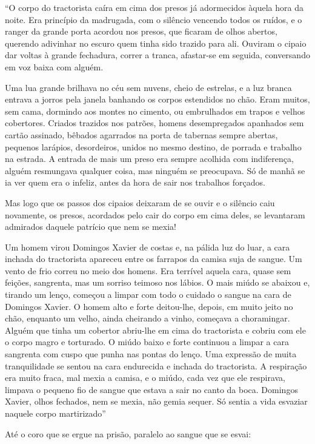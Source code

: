 \documentclass[
  letterpaper,
  DIV=11,
  numbers=noendperiod]{scrreprt}
\begin{document}
``O corpo do tractorista caíra em cima dos presos já adormecidos àquela
hora da noite. Era princípio da madrugada, com o silêncio vencendo todos
os ruídos, e o ranger da grande porta acordou nos presos, que ficaram de
olhos abertos, querendo adivinhar no escuro quem tinha sido trazido para
ali. Ouviram o cipaio dar voltas à grande fechadura, correr a tranca,
afastar-se em seguida, conversando em voz baixa com alguém.

Uma lua grande brilhava no céu sem nuvens, cheio de estrelas, e a luz
branca entrava a jorros pela janela banhando os corpos estendidos no
chão. Eram muitos, sem cama, dormindo aos montes no cimento, ou
embrulhados em trapos e velhos cobertores. Criados trazidos nos patrões,
homens desempregados apanhados sem cartão assinado, bêbados agarrados na
porta de tabernas sempre abertas, pequenos larápios, desordeiros, unidos
no mesmo destino, de porrada e trabalho na estrada. A entrada de mais um
preso era sempre acolhida com indiferença, alguém resmungava qualquer
coisa, mas ninguém se preocupava. Só de manhã se ia ver quem era o
infeliz, antes da hora de sair nos trabalhos forçados.

Mas logo que os passos dos cipaios deixaram de se ouvir e o silêncio
caiu novamente, os presos, acordados pelo cair do corpo em cima deles,
se levantaram admirados daquele patrício que nem se mexia!

Um homem virou Domingos Xavier de costas e, na pálida luz do luar, a
cara inchada do tractorista apareceu entre os farrapos da camisa suja de
sangue. Um vento de frio correu no meio dos homens. Era terrível aquela
cara, quase sem feições, sangrenta, mas um sorriso teimoso nos lábios. O
mais miúdo se abaixou e, tirando um lenço, começou a limpar com todo o
cuidado o sangue na cara de Domingos Xavier. O homem alto e forte
deitou-lhe, depois, cm muito jeito no chão, enquanto um velho, ainda
cheirando a vinho, começava a choramingar. Alguém que tinha um cobertor
abriu-lhe em cima do tractorista e cobriu com ele o corpo magro e
torturado. O miúdo baixo e forte continuou a limpar a cara sangrenta com
cuspo que punha nas pontas do lenço. Uma expressão de muita
tranquilidade se sentou na cara endurecida e inchada do tractorista. A
respiração era muito fraca, mal mexia a camisa, e o miúdo, cada vez que
ele respirava, limpava o pequeno fio de sangue que estava a sair no
canto da boca. Domingos Xavier, olhos fechados, nem se mexia, não gemia
sequer. Só sentia a vida esvaziar naquele corpo martirizado''

Até o coro que se ergue na prisão, paralelo ao sangue que se esvai:
\end{document}
